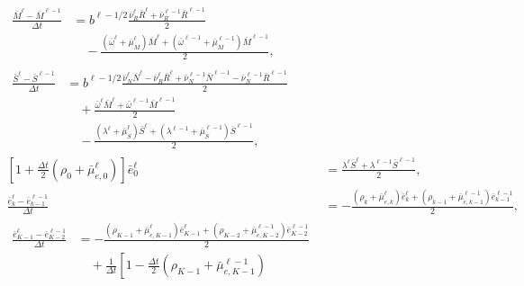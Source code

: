\documentclass[USenglish]{article}
\begin{document}
\begin{subequations}
  \label{numerics_age_and_time_since_entry_structured_agg_age}
  \begin{align}
    \begin{split}
      \frac{\bar{M}^{\ell} - \bar{M}^{\ell - 1}}{\Delta t}
      &=
      b^{\ell - 1 / 2}
      \frac{\bar{\nu}_R^{\ell} \bar{R}^{\ell}
        + \bar{\nu}_R^{\ell - 1} \bar{R}^{\ell - 1}}{2}
      \\ & \quad {}
      - \frac{(\bar{\omega}^{\ell} + \bar{\mu}_M^{\ell}) \bar{M}^{\ell}
        + (\bar{\omega}^{\ell - 1} + \bar{\mu}_M^{\ell - 1}) \bar{M}^{\ell - 1}}
      {2},
    \end{split}
    \\
    \begin{split}
      \frac{\bar{S}^{\ell} - \bar{S}^{\ell - 1}}{\Delta t}
      &= b^{\ell - 1 / 2}
      \frac{\bar{\nu}_N^{\ell} \bar{N}^{\ell}
        - \bar{\nu}_R^{\ell} \bar{R}^{\ell}
        + \bar{\nu}_N^{\ell - 1} \bar{N}^{\ell - 1}
        - \bar{\nu}_N^{\ell - 1} \bar{R}^{\ell - 1}}{2}
      \\ & \quad {}
      + \frac{\bar{\omega}^{\ell} \bar{M}^{\ell}
        + \bar{\omega}^{\ell - 1} \bar{M}^{\ell - 1}}{2}
      \\ & \quad {}
      - \frac{(\lambda^{\ell} + \bar{\mu}_S^{\ell}) \bar{S}^{\ell}
        + (\lambda^{\ell - 1} + \bar{\mu}_S^{\ell - 1}) \bar{S}^{\ell - 1}}{2},
    \end{split}
    \\
    \left[1 + \frac{\Delta t}{2} (\rho_0 + \bar{\mu}_{e, 0}^{\ell})\right]
    \bar{e}_0^{\ell}
      &= \frac{
        \lambda^{\ell} \bar{S}^{\ell}
        + \lambda^{\ell - 1} \bar{S}^{\ell - 1}
      }{2},
    \\
    \frac{\bar{e}_k^{\ell} - \bar{e}_{k - 1}^{\ell - 1}}{\Delta t}
    &= - \frac{
      (\rho_k + \bar{\mu}_{e, k}^{\ell}) \bar{e}_k^{\ell}
      + (\rho_{k - 1} + \bar{\mu}_{e, k - 1}^{\ell - 1})
      \bar{e}_{k - 1}^{\ell - 1}
    }{2},
    \\
    \begin{split}
      \frac{\bar{e}_{K - 1}^{\ell} - \bar{e}_{K - 2}^{\ell - 1}}{\Delta t}
      &= - \frac{
        (\rho_{K - 1} + \bar{\mu}_{e, K - 1}^{\ell})
        \bar{e}_{K - 1}^{\ell}
        + (\rho_{K - 2} + \bar{\mu}_{e, K - 2}^{\ell - 1})
        \bar{e}_{K - 2}^{\ell - 1}
      }{2}
      \\ & \quad {}
      + \frac{1}{\Delta t} \left[
        1 - \frac{\Delta t}{2} (\rho_{K - 1} + \bar{\mu}_{e, K - 1}^{\ell - 1})

\end{split}
\end{align}
\end{subequations}
\end{document}
